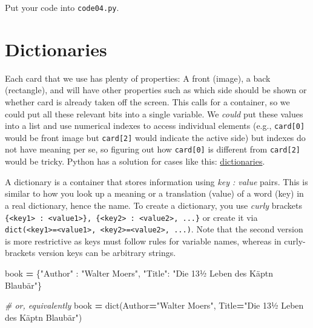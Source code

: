 \documentclass[
]{book}
\newenvironment{Shaded}{\begin{snugshade}}{\end{snugshade}}
\newcommand{\BuiltInTok}[1]{#1}
\newcommand{\CommentTok}[1]{\textcolor[rgb]{0.56,0.35,0.01}{\textit{#1}}}
\newcommand{\NormalTok}[1]{#1}
\newcommand{\OperatorTok}[1]{\textcolor[rgb]{0.81,0.36,0.00}{\textbf{#1}}}
\newcommand{\StringTok}[1]{\textcolor[rgb]{0.31,0.60,0.02}{#1}}
\begin{document}
Put your code into \texttt{code04.py}.

\hypertarget{dictionaries}{%
\section{Dictionaries}\label{dictionaries}}

Each card that we use has plenty of properties: A front (image), a back (rectangle), and will have other properties such as which side should be shown or whether card is already taken off the screen. This calls for a container, so we could put all these relevant bits into a single variable. We \emph{could} put these values into a list and use numerical indexes to access individual elements (e.g., \texttt{card{[}0{]}} would be front image but \texttt{card{[}2{]}} would indicate the active side) but indexes do not have meaning per se, so figuring out how \texttt{card{[}0{]}} is different from \texttt{card{[}2{]}} would be tricky. Python has a solution for cases like this: \href{https://docs.python.org/3/library/stdtypes.html\#dict}{dictionaries}.

A dictionary is a container that stores information using \emph{key : value} pairs. This is similar to how you look up a meaning or a translation (value) of a word (key) in a real dictionary, hence the name. To create a dictionary, you use \emph{curly} brackets \texttt{\{\textless{}key1\textgreater{}\ :\ \textless{}value1\textgreater{}\},\ \{\textless{}key2\textgreater{}\ :\ \textless{}value2\textgreater{},\ ...\}} or create it via \texttt{dict(\textless{}key1\textgreater{}=\textless{}value1\textgreater{},\ \textless{}key2\textgreater{}=\textless{}value2\textgreater{},\ ...)}. Note that the second version is more restrictive as keys must follow rules for variable names, whereas in curly-brackets version keys can be arbitrary strings.

\begin{Shaded}
\begin{Highlighting}[]
\NormalTok{book }\OperatorTok{=}\NormalTok{ \{}\StringTok{"Author"}\NormalTok{ : }\StringTok{"Walter Moers"}\NormalTok{,}
        \StringTok{"Title"}\NormalTok{: }\StringTok{"Die 13½ Leben des Käpt\textquotesingle{}n Blaubär"}\NormalTok{\}}
        
\CommentTok{\# or, equivalently}
\NormalTok{book }\OperatorTok{=} \BuiltInTok{dict}\NormalTok{(Author}\OperatorTok{=}\StringTok{"Walter Moers"}\NormalTok{,}
\NormalTok{            Title}\OperatorTok{=}\StringTok{"Die 13½ Leben des Käpt\textquotesingle{}n Blaubär"}\NormalTok{)}
\end{Highlighting}
\end{Shaded}
\end{document}
